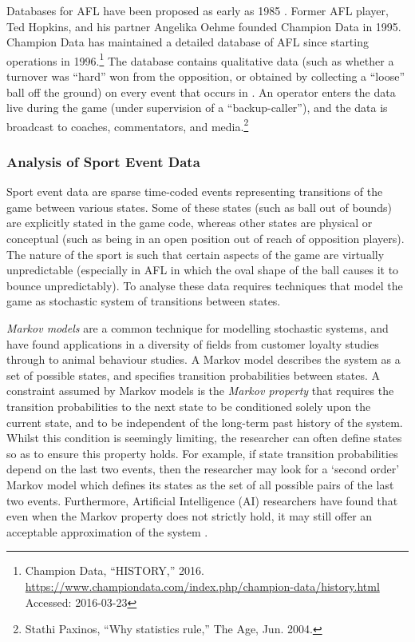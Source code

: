 Databases for AFL have been proposed as early as 1985
\cite{Patrick1985}. Former AFL player, Ted Hopkins, and his
partner Angelika Oehme founded Champion Data in 1995. Champion Data has
maintained a detailed database of AFL since starting operations in
1996.\footnote{Champion Data, ``HISTORY,'' 2016.
  \url{https://www.championdata.com/index.php/champion-data/history.html}
  Accessed: 2016-03-23} The database contains qualitative data (such as
whether a turnover was ``hard'' won from the opposition, or obtained by
collecting a ``loose'' ball off the ground) on every event that occurs
in \afl{}. An operator enters the data live during the game
(under supervision of a ``backup-caller''), and the data is broadcast to
coaches, commentators, and media.\footnote{Stathi Paxinos, ``Why
  statistics rule,'' The Age, Jun. 2004.}

\subsubsection{Analysis of Sport Event
Data}\label{analysis-of-sport-event-data}

Sport event data are sparse time-coded events representing transitions
of the game between various states. Some of these states (such as ball
out of bounds) are explicitly stated in the game code, whereas other
states are physical or conceptual (such as being in an open position out
of reach of opposition players). The nature of the sport is such that
certain aspects of the game are virtually unpredictable (especially in
AFL in which the oval shape of the ball causes it to bounce
unpredictably). To analyse these data requires techniques that model the
game as stochastic system of transitions between states.

\emph{Markov models} are a common technique for modelling stochastic
systems, and have found applications in a diversity of fields from
customer loyalty studies through to animal behaviour studies. A Markov
model describes the system as a set of possible states, and specifies
transition probabilities between states. A constraint assumed by Markov
models is the \emph{Markov property} that requires the transition
probabilities to the next state to be conditioned solely upon the
current state, and to be independent of the long-term past history of
the system. Whilst this condition is seemingly limiting, the researcher
can often define states so as to ensure this property holds. For
example, if state transition probabilities depend on the last two
events, then the researcher may look for a `second order' Markov model
which defines its states as the set of all possible pairs of the last
two events. Furthermore, Artificial Intelligence (AI) researchers have
found that even when the Markov property does not strictly hold, it may
still offer an acceptable approximation of the system \cite{sutton1998reinforcement}.

